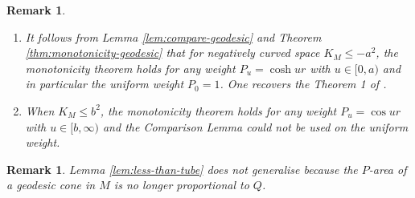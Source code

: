 \documentclass[11pt]{article}
\newtheorem{remark}[theorem]{Remark}
\begin{document}
\begin{remark}
\label{rem:compare-geodesic}
\begin{enumerate}
\item It follows from Lemma \ref{lem:compare-geodesic} and Theorem \ref{thm:monotonicity-geodesic} that for negatively curved space \(K_M\leq -a^2\), the monotonicity theorem holds for
any weight \(P_u =\cosh ur\) with \(u\in [0, a)\) and in particular the uniform weight
\(P_0 = 1\). One recovers the Theorem 1 of \cite{Anderson82_CompleteMinimalVarieties}.
\item When \(K_M\leq b^2\), the monotonicity theorem holds for any weight \(P_u = \cos
   ur\) with \(u\in[b,\infty)\) and the Comparison Lemma 
could not be used on the uniform weight.
\end{enumerate}
\end{remark}

\begin{remark}
\label{rem:no-less-tube}
Lemma \ref{lem:less-than-tube} does not generalise because the \(P\)-area of a
geodesic cone in \(M\) is  no longer proportional to \(Q\).
\end{remark}
\end{document}

